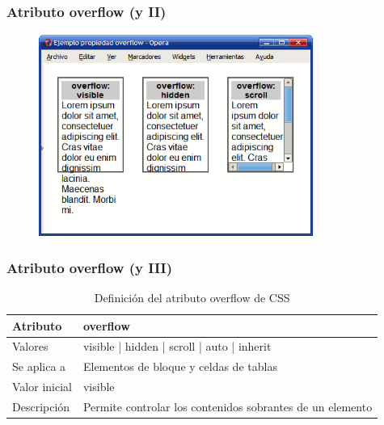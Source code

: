 \documentclass[ucs]{beamer}
\begin{document}

\begin{frame}
\frametitle{Atributo overflow (y II)}

\begin{center}
\begin{figure}[p]
\includegraphics[width=0.8\textwidth]{figs/f0524.png}
\end{figure}
\end{center}

\end{frame}



\begin{frame}
\frametitle{Atributo overflow (y III)}

\begin{center}
  \begin{table}
   \begin{tabular}{p{1.8cm}p{7.8cm}}
Atributo & \bf{overflow} \\ \hline
Valores& visible | hidden | scroll | auto | inherit \\ \hline
Se aplica a& Elementos de bloque y celdas de tablas \\ \hline
Valor inicial& visible \\ \hline
Descripción& Permite controlar los contenidos sobrantes de un elemento \\ \hline
  \end{tabular}
   \caption{Definición del atributo overflow de CSS}
 \end{table}
\end{center}


\end{frame}
\end{document}
